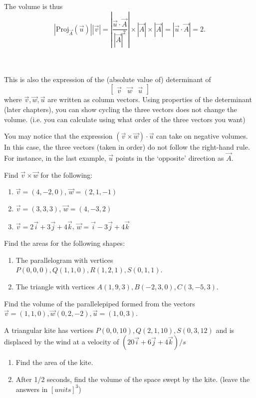 The volume is thus \[
	|\textrm{Proj}_{\vec{A}}(\vec{u})||\vec{v}|=\left|\frac{\vec{u}\cdot\vec{A}}{|\vec{A}|^2}\right|\times |\vec{A}| \times|\vec{A}| = |\vec{u}\cdot\vec{A}| = 2.
\]\ \\

\ \\

\begin{remark}
	This is also the expression of the (absolute value of) determinant of \[
	\begin{bmatrix}
		\vec{v}&\vec{w}&\vec{u}
	\end{bmatrix}
	\]
	where $\vec{v},\vec{w},\vec{u}$ are written as column vectors.
	Using properties of the determinant (later chapters), you can show cycling the three vectors does not change the volume. (i.e. you can calculate using what order of the three vectors you want)
\end{remark}
	
\begin{remark}
	You may notice that the expression $(\vec{v}\times\vec{w})\cdot{\vec{u}}$ can take on negative volumes. In this case, the three vectors (taken in order) do not follow the right-hand rule. For instance, in the last example, $\vec{u}$ points in the `opposite' direction as $\vec{A}$.
\end{remark}
\exercises
\begin{exerciselist}
	\item Find $\vec{v}\times\vec{w}$ for the following: \begin{enumerate}[label=(\alph*)]
		\item $\vec{v}=(4,-2,0)$, $\vec{w}=(2,1,-1)$
		\item $\vec{v}=(3,3,3)$, $\vec{w}=(4,-3,2)$
		\item $\vec{v}=2\vec{i}+3\vec{j}+4\vec{k}$, $\vec{w}=\vec{i}-3\vec{j}+4\vec{k}$
	\end{enumerate}
	\item Find the areas for the following shapes:\begin{enumerate}[label=(\alph*)]
		\item The parallelogram with vertices $P(0,0,0), Q(1,1,0),R(1,2,1),S(0,1,1)$.
		\item The triangle with vertices $A(1,9,3),B(-2,3,0),C(3,-5,3)$.
	\end{enumerate}
	\item Find the volume of the parallelepiped formed from the vectors $\vec{v}=(1,1,0),\vec{w}(0,2,-2),\vec{u}=(1,0,3)$.
	\item A triangular kite has vertices $P(0,0,10),Q(2,1,10),S(0,3,12)$ and is displaced by the wind at a velocity of $(20\vec{i}+6\vec{j}+4\vec{k})/s$\begin{enumerate}[label=(\alph*)]
		\item Find the area of the kite.
		\item After 1/2 seconds, find the volume of the space swept by the kite. (leave the answers in $[units]^3$)
	\end{enumerate}
\end{exerciselist}

